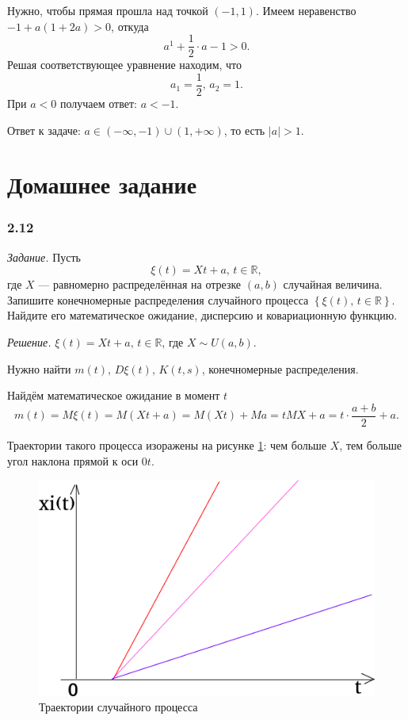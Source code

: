 Нужно, чтобы прямая прошла над точкой $ \left( -1, 1 \right) $.
Имеем неравенство $-1 + a \left( 1 + 2a \right) > 0$, откуда
$$a^1 + \frac{1}{2} \cdot a - 1 >
  0.$$
Решая соответствующее уравнение находим, что
$$a_1 = \frac{1}{2}, \,
  a_2 = 1.$$
При $a < 0$ получаем ответ: $a < -1$.

Ответ к задаче: $a \in \left( - \infty, -1 \right) \cup \left( 1, + \infty \right) $,
то есть $ \left| a \right| > 1$.

\section*{Домашнее задание}

\subsubsection*{2.12}

\textit{Задание.}
Пусть
$$ \xi \left( t \right) =
  Xt + a, \,
  t \in \mathbb{R},$$
где $X$ --- равномерно распределённая на отрезке $ \left( a, b \right) $ случайная величина.
Запишите конечномерные распределения случайного процесса
$ \left\{ \xi \left( t \right), \, t \in \mathbb{R} \right\} $.
Найдите его математическое ожидание, дисперсию и ковариационную функцию.

\textit{Решение.}
$ \xi \left( t \right) = Xt + a, \, t \in \mathbb{R}$, где $X \sim U \left( a, b \right) $.

Нужно найти $m \left( t \right), \, D \xi \left( t \right), \, K \left( t, s \right) $,
конечномерные распределения.

Найдём математическое ожидание в момент $t$
$$m \left( t \right) =
  M \xi \left( t \right) =
  M \left( Xt + a \right) =
  M \left( Xt \right) + Ma =
  tMX + a =
  t \cdot \frac{a + b}{2} + a.$$

Траектории такого процесса изоражены на рисунке \ref{fig:212}: чем больше $X$,
тем больше угол наклона прямой к оси $0t$.

\begin{figure}[h!]
 \centering
 \includegraphics[width=.5\textwidth]{./pictures/2_12.png}
 \caption{Траектории случайного процесса}
 \label{fig:212}
\end{figure}

